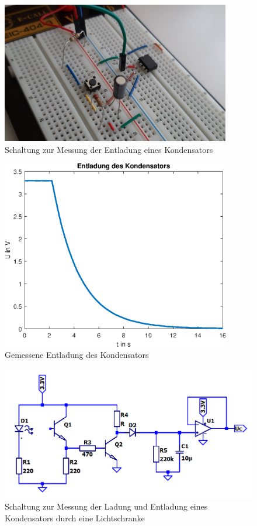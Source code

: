 \begin{figure}[htb]
    \includegraphics[width=10cm]{./res/Kondensator_Entladung}
    \caption{Schaltung zur Messung der Entladung eines Kondensators}
    \label{fig:KondensatorEntladung}
\end{figure}

\newpage

\begin{figure}[htb]
    \includegraphics[width=10cm]{./res/Kondensator_Entladung_Messung}
    \caption{Gemessene Entladung des Kondensators}
    \label{fig:KondensatorEntladungMess}
\end{figure}

\begin{figure}[htb]
    \includegraphics[width=14cm]{./res/Lichtschranke_1_Spice}
    \caption{Schaltung zur Messung der Ladung und Entladung eines Kondensators durch eine Lichtschranke}
    \label{fig:KondensatorLadungLichtschranke}
\end{figure}

